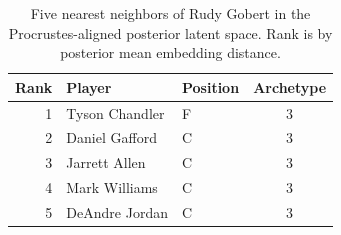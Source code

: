 \begin{table}[htbp]
  \centering\small
  \begin{tabular}{rllc}
    \toprule
    Rank & Player & Position & Archetype \\
    \midrule
    1 & Tyson Chandler & F & 3 \\
    2 & Daniel Gafford & C & 3 \\
    3 & Jarrett Allen & C & 3 \\
    4 & Mark Williams & C & 3 \\
    5 & DeAndre Jordan & C & 3 \\
    \bottomrule
  \end{tabular}
  \caption{Five nearest neighbors of Rudy Gobert in the Procrustes-aligned posterior latent space. Rank is by posterior mean embedding distance.}
  \label{tab:Rudy_Gobert_neighbors}
\end{table}

